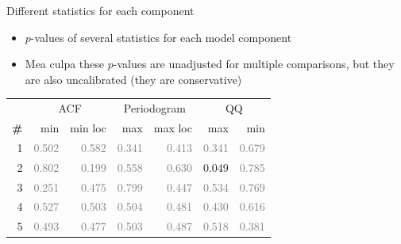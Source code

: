 \begin{frame}{Different statistics for each component}

\begin{itemize}
  \item $p$-values of several statistics for each model component
  \item Mea culpa these $p$-values are unadjusted for multiple comparisons, but they are also uncalibrated (they are conservative)
\end{itemize}

\vspace{\baselineskip}

\begin{center}
\begin{tabular}{|r|rr|rr|rr|}
\hline
 & \multicolumn{2}{c|}{ACF} & \multicolumn{2}{c|}{Periodogram} & \multicolumn{2}{c|}{QQ} \\
\bf{\#} & {min} & {min loc} & {max} & {max loc} & {max} & {min}\\
\hline

1 & \textcolor{gray}{0.502} & \textcolor{gray}{0.582} & \textcolor{gray}{0.341} & \textcolor{gray}{0.413} & \textcolor{gray}{0.341} & \textcolor{gray}{0.679}\\

2 & \textcolor{gray}{0.802} & \textcolor{gray}{0.199} & \textcolor{gray}{0.558} & \textcolor{gray}{0.630} & 0.049 & \textcolor{gray}{0.785}\\

3 & \textcolor{gray}{0.251} & \textcolor{gray}{0.475} & \textcolor{gray}{0.799} & \textcolor{gray}{0.447} & \textcolor{gray}{0.534} & \textcolor{gray}{0.769}\\

4 & \textcolor{gray}{0.527} & \textcolor{gray}{0.503} & \textcolor{gray}{0.504} & \textcolor{gray}{0.481} & \textcolor{gray}{0.430} & \textcolor{gray}{0.616}\\

5 & \textcolor{gray}{0.493} & \textcolor{gray}{0.477} & \textcolor{gray}{0.503} & \textcolor{gray}{0.487} & \textcolor{gray}{0.518} & \textcolor{gray}{0.381}\\

\hline
\end{tabular}
\end{center}

\end{frame}

